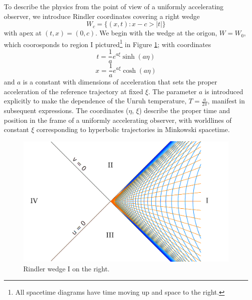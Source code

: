 \documentclass[12pt,a4paper]{article}
\begin{document}
To describe the physics from the point of view of a uniformly accelerating observer, we introduce Rindler coordinates covering a right wedge 
\begin{equation}
  W_c = \{(x,t) : x-c>|t|\}
\end{equation}
with apex at $(t,x)=(0,c)$.  We begin with the wedge at the origon, $W = W_0$, which coorosponds to region I pictured\footnote{All spacetime diagrams have time moving up and space to the right.} in Figure \ref{rindlerw}; with coordinates
\begin{equation}
  t = \frac{1}{a}e^{a\xi}\sinh{(a\eta)}
\label{sinh}
\end{equation}
\begin{equation}
x = \frac{1}{a}e^{a\xi}\cosh{(a\eta)}
\end{equation}
and $a$ is a constant with dimensions of acceleration that sets the proper acceleration of the reference trajectory at fixed $\xi$.  The parameter $a$ is introduced explicitly to make the dependence of the Unruh temperature, $T = \frac{a}{2\pi}$, manifest in subsequent expressions. The coordinates ($\eta$, $\xi$) describe the proper time and position in the frame of a uniformly accelerating observer, with worldlines of constant $\xi$ corresponding to hyperbolic trajectories in Minkowski spacetime.

\begin{figure}[h]
\centering
\includegraphics[scale=0.2]{rindler_w.png}
\caption{Rindler wedge I on the right.}
\label{rindlerw}
\end{figure}
\end{document}
